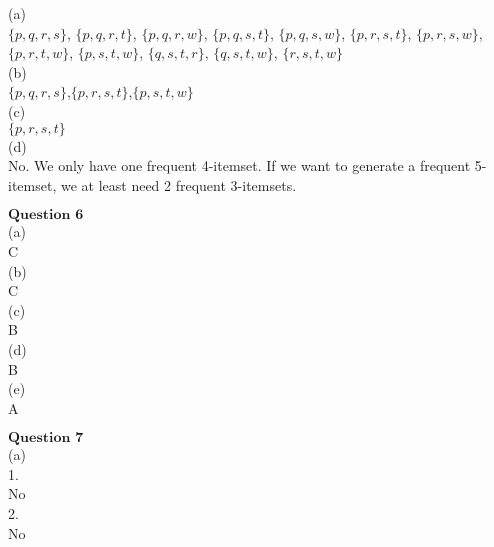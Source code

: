 \documentclass[12pt]{article}
\begin{document}
(a)\\

 $\{p,q,r,s\}$, $\{p,q,r,t\}$, $\{p,q,r,w\}$, $\{p,q,s,t\}$, $\{p,q,s,w\}$, $\{p,r,s,t\}$, $\{p,r,s,w\}$, $\{p,r,t,w\}$, $\{p,s,t,w\}$, $\{q,s,t,r\}$, $\{q,s,t,w\}$, $\{r,s,t,w\}$\\

(b)\\

$\{p,q,r,s\}$,$\{p,r,s,t\}$,$\{p,s,t,w\}$\\

(c)\\

$\{p,r,s,t\}$\\

(d)\\

No. We only have one frequent 4-itemset. If we want to generate a frequent 5-itemset, we at least need 2 frequent 3-itemsets.\\

\newpage

$\textbf{Question 6}$\\

(a)\\

C\\

(b)\\

C\\

(c)\\

B\\

(d)\\

B\\

(e)\\

A\\

\newpage

$\textbf{Question 7}$\\

(a)\\

1.\\

No\\

2.\\

No\\
\end{document}
